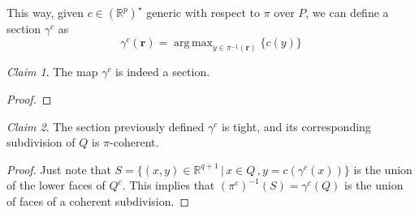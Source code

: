 \documentclass[10pt,a4paper]{article}
\DeclareMathOperator*{\argmax}{arg\,max}
\newcommand{\RR}{\mathbb{R}}
\theoremstyle{plain}
\theoremstyle{remark}
\newtheorem{claim}{Claim}
\theoremstyle{definition}
\begin{document}




This way, given $c\in (\RR^p)^\star$ generic with respect to $\pi$ over $P$, we can define a section $\gamma^c$ as
\begin{equation}
\gamma^c(\bm r) = \argmax_{y \in \pi^{-1}(\bm r)}\{ c(y) \}
\end{equation}
\begin{claim} 
	The map $\gamma^c$ is indeed a section.
\end{claim}
\begin{proof}
\end{proof}

\begin{claim}
	The section previously defined $\gamma^c$ is tight,
	and its corresponding subdivision of $Q$ is $\pi$-coherent.
\end{claim}
\begin{proof} 
	Just note that $S=\{ (x,y) \in \RR^{q+1} \, | \, x\in Q \, , y=c(\gamma^c(x)) \}$ is the union of the lower faces of $Q^c$. 
	This implies that $(\pi^c)^{-1}(S)=\gamma^c(Q)$ is the union of faces of a coherent subdivision.  
\end{proof}
\end{document}
